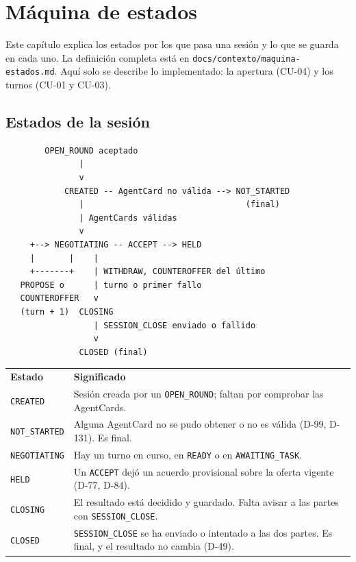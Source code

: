 \chapter{Máquina de estados}

Este capítulo explica los estados por los que pasa una sesión y lo que se guarda en cada uno. La definición completa está en \texttt{docs/contexto/maquina-estados.md}. Aquí solo se describe lo implementado: la apertura (CU-04) y los turnos (CU-01 y CU-03).

\section{Estados de la sesión}

\begin{verbatim}
        OPEN_ROUND aceptado
               |
               v
            CREATED -- AgentCard no válida --> NOT_STARTED
               |                                 (final)
               | AgentCards válidas
               v
     +--> NEGOTIATING -- ACCEPT --> HELD
     |       |    |
     +-------+    | WITHDRAW, COUNTEROFFER del último
   PROPOSE o      | turno o primer fallo
   COUNTEROFFER   v
   (turn + 1)  CLOSING
                  | SESSION_CLOSE enviado o fallido
                  v
               CLOSED (final)
\end{verbatim}

\begin{tabular}{p{3cm}p{10.5cm}}
  \textbf{Estado} & \textbf{Significado} \\
  \texttt{CREATED} & Sesión creada por un \texttt{OPEN\_ROUND}; faltan por comprobar las AgentCards. \\
  \texttt{NOT\_STARTED} & Alguna AgentCard no se pudo obtener o no es válida (D-99, D-131). Es final. \\
  \texttt{NEGOTIATING} & Hay un turno en curso, en \texttt{READY} o en \texttt{AWAITING\_TASK}. \\
  \texttt{HELD} & Un \texttt{ACCEPT} dejó un acuerdo provisional sobre la oferta vigente (D-77, D-84). \\
  \texttt{CLOSING} & El resultado está decidido y guardado. Falta avisar a las partes con \texttt{SESSION\_CLOSE}. \\
  \texttt{CLOSED} & \texttt{SESSION\_CLOSE} se ha enviado o intentado a las dos partes. Es final, y el resultado no cambia (D-49). \\
\end{tabular}

